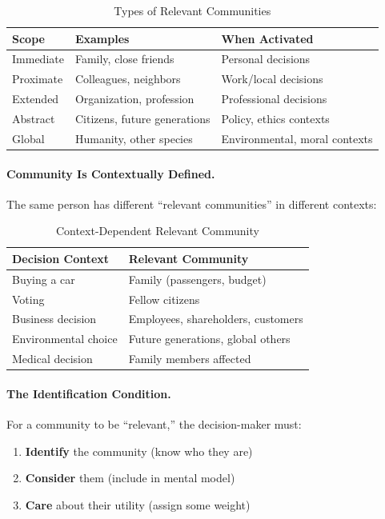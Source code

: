 \begin{table}[htbp]
\centering
\caption{Types of Relevant Communities}
\label{tab:relevant-community}
\renewcommand{\arraystretch}{1.3}
\begin{tabular}{@{}lll@{}}
\toprule
\textbf{Scope} & \textbf{Examples} & \textbf{When Activated} \\
\midrule
Immediate & Family, close friends & Personal decisions \\
Proximate & Colleagues, neighbors & Work/local decisions \\
Extended & Organization, profession & Professional decisions \\
Abstract & Citizens, future generations & Policy, ethics contexts \\
Global & Humanity, other species & Environmental, moral contexts \\
\bottomrule
\end{tabular}
\end{table}

\paragraph{Community Is Contextually Defined.}
The same person has different ``relevant communities'' in different contexts:

\begin{table}[htbp]
\centering
\caption{Context-Dependent Relevant Community}
\label{tab:context-community}
\renewcommand{\arraystretch}{1.3}
\begin{tabular}{@{}ll@{}}
\toprule
\textbf{Decision Context} & \textbf{Relevant Community} \\
\midrule
Buying a car & Family (passengers, budget) \\
Voting & Fellow citizens \\
Business decision & Employees, shareholders, customers \\
Environmental choice & Future generations, global others \\
Medical decision & Family members affected \\
\bottomrule
\end{tabular}
\end{table}

\paragraph{The Identification Condition.}
For a community to be ``relevant,'' the decision-maker must:
\begin{enumerate}
\item \textbf{Identify} the community (know who they are)
\item \textbf{Consider} them (include in mental model)
\item \textbf{Care} about their utility (assign some weight)
\end{enumerate}

